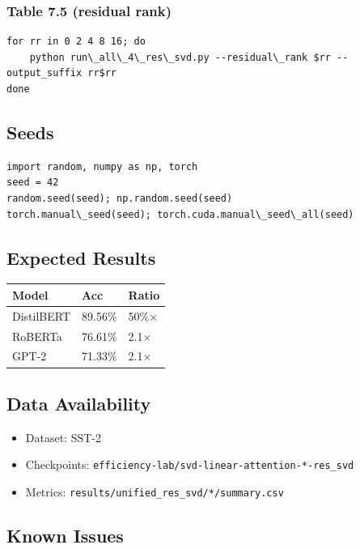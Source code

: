 \subsubsection{Table 7.5 (residual rank)}
\begin{lstlisting}
for rr in 0 2 4 8 16; do
    python run\_all\_4\_res\_svd.py --residual\_rank $rr --output_suffix rr$rr
done
\end{lstlisting}

\subsection{Seeds}

\begin{lstlisting}
import random, numpy as np, torch
seed = 42
random.seed(seed); np.random.seed(seed)
torch.manual\_seed(seed); torch.cuda.manual\_seed\_all(seed)
\end{lstlisting}

\subsection{Expected Results}

\begin{table}[H]
\centering
\small
\begin{tabular}{lll}
\toprule
\textbf{Model} & \textbf{Acc} & \textbf{Ratio} \\
\midrule
DistilBERT & 89.56\% & 50\%$\times$ \\
RoBERTa & 76.61\% & 2.1$\times$ \\
GPT-2 & 71.33\% & 2.1$\times$ \\
\bottomrule
\end{tabular}
\end{table}

\subsection{Data Availability}

\begin{itemize}
\item Dataset: SST-2
\item Checkpoints: \texttt{efficiency-lab/svd-linear-attention-*-res\_svd}
\item Metrics: \texttt{results/unified\_res\_svd/*/summary.csv}

\end{itemize}
\subsection{Known Issues}

